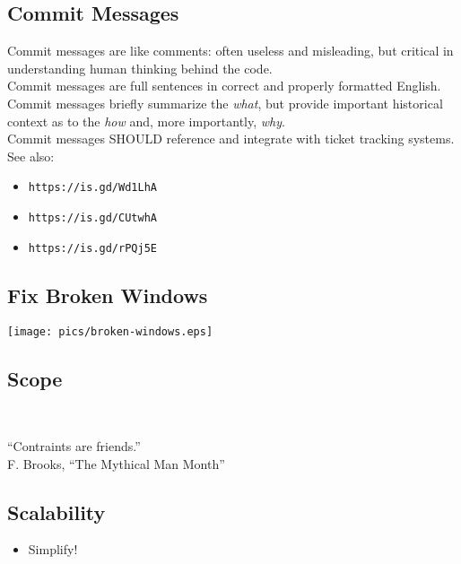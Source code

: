 \documentclass[xga]{xdvislides}
\begin{document}
\subsection{Commit Messages}

Commit messages are like comments: often useless and
misleading, but critical in understanding human
thinking behind the code. \\

Commit messages are full sentences in correct and
properly formatted English.
\\

Commit messages briefly summarize the {\em what}, but
provide important historical context as to the {\em
how} and, more importantly, {\em why}. \\

Commit messages SHOULD reference and integrate with
ticket tracking systems. \\

See also:
\begin{itemize}
        \item \verb+https://is.gd/Wd1LhA+
        \item \verb+https://is.gd/CUtwhA+
        \item \verb+https://is.gd/rPQj5E+
\end{itemize}


\subsection{Fix Broken Windows}
\vspace*{\fill}
\begin{center}
	\texttt{[image: pics/broken-windows.eps]}
\end{center}
\vspace*{\fill}

\subsection{Scope}
\\
\Huge
\begin{center}
	``Contraints are friends.'' \\
	\addvspace{.2in}
	\small F. Brooks, ``The Mythical Man Month''
\end{center}
\Normalsize


\subsection{Scalability}
\begin{itemize}
	\item Simplify!
\end{itemize}
\end{document}
